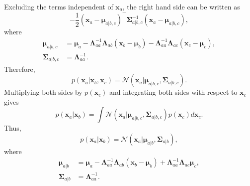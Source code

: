 %
Excluding the terms independent of $\mathbf{x}_a$, the right hand side can be written as
%
\begin{equation}
- 
\frac{1}{2} 
(\mathbf{x}_a - \bm{\mu}_{a | b, c}) ^ \intercal 
\bm{\Sigma}_{a | b, c} ^ {- 1} 
(\mathbf{x}_a - \bm{\mu}_{a | b, c}),
\end{equation}
%
where
%
\begin{equation}
\begin{aligned}
\bm{\mu}_{a | b, c}
&= 
\bm{\mu}_a 
- 
\bm{\Lambda}_{aa} ^ {- 1} 
\bm{\Lambda}_{ab} 
\left( 
	\mathbf{x}_b 
	- 
	\bm{\mu}_b 
\right) 
- 
\bm{\Lambda}_{aa} ^ {- 1} 
\bm{\Lambda}_{ac} 
\left( 
	\mathbf{x}_c 
	- 
	\bm{\mu}_c 
\right), 
\\
\bm{\Sigma}_{a | b, c}
&= 
\bm{\Lambda}_{aa} ^ {- 1}.
\end{aligned}
\end{equation}
%
Therefore,
%
\begin{equation}
p(\mathbf{x}_a | \mathbf{x}_b, \mathbf{x}_c)
= 
\mathcal{N}(\mathbf{x}_a | \bm{\mu}_{a | b, c}, \bm{\Sigma}_{a | b, c}).
\end{equation}
%
Multiplying both sides by $p(\mathbf{x}_c)$ and integrating both sides with respect to $\mathbf{x}_c$ gives
%
\begin{equation}
p(\mathbf{x}_a | \mathbf{x}_b)
= 
\int 
\mathcal{N}(\mathbf{x}_a | \bm{\mu}_{a | b, c}, \bm{\Sigma}_{a | b, c}) p(\mathbf{x}_c) 
d\mathbf{x}_c.
\end{equation}
%
Thus,
%
\begin{equation}
p(\mathbf{x}_a | \mathbf{x}_b)
= 
\mathcal{N}(\mathbf{x}_a | \bm{\mu}_{a | b}, \bm{\Sigma}_{a | b}),
\end{equation}
%
where
%
\begin{equation}
\begin{aligned}
\bm{\mu}_{a | b}
&= 
\bm{\mu}_a 
- 
\bm{\Lambda}_{aa} ^ {- 1} 
\bm{\Lambda}_{ab} 
\left( 
	\mathbf{x}_b 
	- 
	\bm{\mu}_b 
\right) 
+ 
\bm{\Lambda}_{aa} ^ {- 1} 
\bm{\Lambda}_{ac} 
\bm{\mu}_c, 
\\
\bm{\Sigma}_{a | b}
&= 
\bm{\Lambda}_{aa} ^ {- 1}.
\end{aligned}
\end{equation}
%


